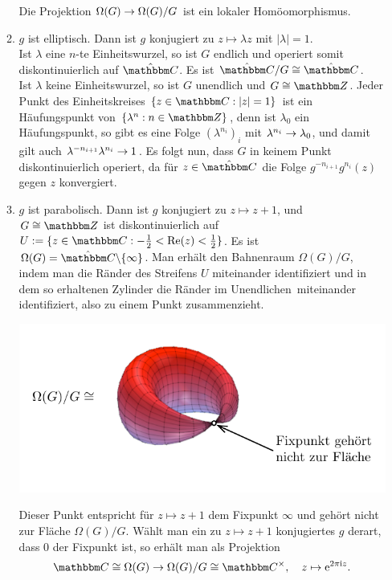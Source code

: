 \documentclass[a4paper, 12pt, twoside]{article}
\begin{document}
\begin{enumerate}
\begin{enumerate}
\begin{center}
\end{center}
Die Projektion $\Omega(G)\rightarrow\Omega(G)/G$ ist ein
lokaler Homöomorphismus.
\item $g$ ist elliptisch.
Dann ist $g$ konjugiert zu $z\mapsto\lambda z$ mit $|\lambda|=1$.\\
Ist $\lambda$ eine $n$-te Einheitswurzel, so ist $G$ endlich und
operiert somit diskontinuierlich auf $\hat{\CC}$.
Es ist $\hat{\CC}/G\cong\hat{\CC}$.\\
Ist $\lambda$ keine Einheitswurzel, so ist $G$ unendlich und
$G\cong\ZZ$. Jeder Punkt des Einheitskreises $\{z\in\CC:|z|=1\}$
ist ein Häufungspunkt von $\{\lambda^n:n\in\ZZ\}$, denn ist
$\lambda_0$ ein Häufungspunkt, so gibt es eine Folge
$(\lambda^{n_i})_i$ mit $\lambda^{n_i}\rightarrow\lambda_0$,
und damit gilt auch $\lambda^{-n_{i+1}}\lambda^{n_i}\rightarrow 1$.
Es folgt nun, dass $G$ in keinem Punkt diskontinuierlich operiert,
da für $z\in\hat{\CC}$ die Folge $g^{-n_{i+1}}g^{n_i}(z)$ gegen
$z$ konvergiert.
\item $g$ ist parabolisch.
Dann ist $g$ konjugiert zu $z\mapsto z+1$, und $G\cong \ZZ$ ist
diskontinuierlich auf
$U:=\{z\in\CC:-\frac{1}{2}<\Re(z)<\frac{1}{2}\}$.
Es ist $\Omega(G)=\hat{\CC}\backslash\{\infty\}$.
Man erhält den Bahnenraum $\Omega(G)/G$, indem man die Ränder
des Streifens $U$ miteinander identifiziert und in dem so 
erhaltenen Zylinder die \glqq Ränder im Unendlichen\grqq\
miteinander identifiziert, also zu einem Punkt zusammenzieht.
\begin{center}
	\includegraphics{grugraImages/cuspTorus}
\end{center}
Dieser Punkt entspricht für $z\mapsto z+1$ dem Fixpunkt $\infty$
und gehört nicht zur Fläche $\Omega(G)/G$.
Wählt man ein zu $z\mapsto z+1$ konjugiertes $g$ derart, dass
$0$ der Fixpunkt ist, so erhält man als Projektion
\[
\CC\cong \Omega(G) \Ra \Omega(G)/G\cong \CC^\times,\quad
z\mapsto \e^{2\pi\i z}.
\]
\end{enumerate}

\end{enumerate}
\end{document}
